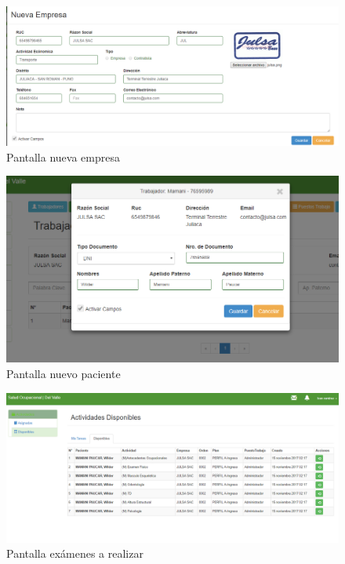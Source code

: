 	\begin{figure}[H]
	    \centering
		\includegraphics[width=18cm]{../imgs/ui/nueva-empresa.png}
		\caption{Pantalla nueva empresa}
		\label{figure:nueva-empresa}
	\end{figure}
	
	\begin{figure}[H]
	    \centering
		\includegraphics[width=18cm]{../imgs/ui/paciente.png}
		\caption{Pantalla nuevo paciente}
		\label{figure:paciente}
	\end{figure}
	
	\begin{figure}[H]
	    \centering
		\includegraphics[width=18cm]{../imgs/ui/disponibles.png}
		\caption{Pantalla exámenes a realizar}
		\label{figure:disponibles}
	\end{figure}
	
